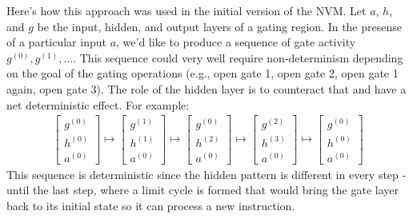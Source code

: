 \documentclass[pdftex,12pt,letterpaper]{article}
\begin{document}
Here's how this approach was used in the initial version of the NVM.  Let $a$, $h$, and $g$ be the input, hidden, and output layers of a gating region.  In the presense of a particular input $a$, we'd like to produce a sequence of gate activity $g^{(0)}, g^{(1)}, ...$.  This sequence could very well require non-determinism depending on the goal of the gating operations (e.g., open gate 1, open gate 2, open gate 1 again, open gate 3).  The role of the hidden layer is to counteract that and have a net deterministic effect.  For example:
\begin{align}
\left[\begin{array}{c}g^{(0)} \\ h^{(0)} \\ a^{(0)}\end{array}\right]\mapsto
\left[\begin{array}{c}g^{(1)} \\ h^{(1)} \\ a^{(0)}\end{array}\right]\mapsto
\left[\begin{array}{c}g^{(0)} \\ h^{(2)} \\ a^{(0)}\end{array}\right]\mapsto
\left[\begin{array}{c}g^{(2)} \\ h^{(3)} \\ a^{(0)}\end{array}\right]\mapsto
\left[\begin{array}{c}g^{(0)} \\ h^{(0)} \\ a^{(0)}\end{array}\right]
\end{align}
This sequence is deterministic since the hidden pattern is different in every step - until the last step, where a limit cycle is formed that would bring the gate layer back to its initial state so it can process a new instruction.
\end{document}
